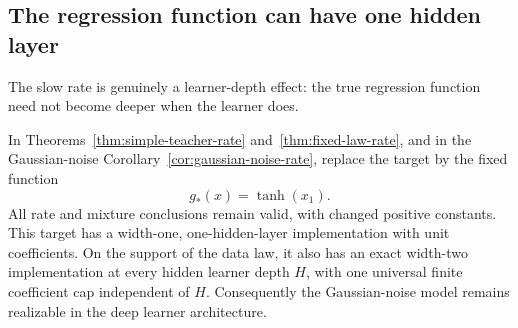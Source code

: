 \subsection{The regression function can have one hidden layer}
\label{sec:shallow-teacher-rate}
The slow rate is genuinely a learner-depth effect: the true regression function need not become deeper when the learner does.

\begin{corollary}
\label{cor:shallow-teacher-rate}
In Theorems~\ref{thm:simple-teacher-rate} and~\ref{thm:fixed-law-rate}, and in the Gaussian-noise Corollary~\ref{cor:gaussian-noise-rate}, replace the target by the fixed function
\[
 g_*(x)=\tanh(x_1).
\]
All rate and mixture conclusions remain valid, with changed positive constants. This target has a width-one, one-hidden-layer implementation with unit coefficients. On the support of the data law, it also has an exact width-two implementation at every hidden learner depth $H$, with one universal finite coefficient cap independent of $H$. Consequently the Gaussian-noise model remains realizable in the deep learner architecture.
\end{corollary}
